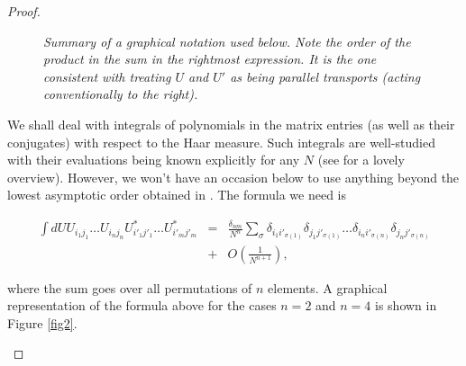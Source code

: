 \documentclass[twoside, a4paper,10pt]{article}
\newcommand{\bes}{\begin{eqnarray}}
\newcommand{\ees}{\end{eqnarray}}
\begin{document}
\begin{proof}
\begin{figure}[h]
\begin{tikzpicture}
\end{tikzpicture}
\caption{\textit{Summary of a graphical notation used below. Note the order of the product in the sum in the rightmost expression. It is the one consistent with treating $U$ and $U'$ as being parallel transports (acting conventionally to the right).}}
\label{fig1}
\end{figure}




We shall deal with integrals of polynomials in the matrix entries (as well as their conjugates) with respect to the Haar measure. Such integrals are well-studied with their evaluations being known explicitly for any $N$ (see \cite{weingarten1} for a lovely overview). However, we won't have an occasion below to use anything beyond the lowest asymptotic order obtained in \cite{weingarten2}. The formula we need is  



\bes
\label{eqnarray:integral}
\int dU U_{i_1 j_1} \dots U_{i_n j_n} U^*_{i'_1 j'_1} \dots U^*_{i'_m j'_m} & = & \frac{\delta_{nm}}{N^n} \sum_\sigma \delta_{i_1 i'_{\sigma(1)}} \delta _{j_1 j'_{\sigma(1)}} \dots \delta_{i_n i'_{\sigma(n)}} \delta _{j_n j'_{\sigma(n)}} \nonumber \\
& + & O(\frac{1}{N^{n+1}}),
\ees

where the sum goes over all permutations of $n$ elements. A graphical representation of the formula above for the cases $n=2$ and $n=4$ is shown in Figure \ref{fig2}. \newline




\begin{figure}[h]
\end{figure}
\end{proof}
\end{document}
